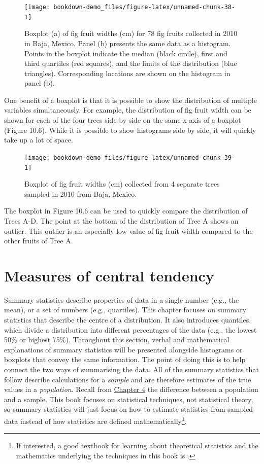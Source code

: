 \documentclass[
]{scrbook}
\begin{document}
\begin{figure}
\texttt{[image: bookdown-demo\_files/figure-latex/unnamed-chunk-38-1]} \caption{Boxplot (a) of fig fruit widths (cm) for 78 fig fruits collected in 2010 in Baja, Mexico. Panel (b) presents the same data as a histogram. Points in the boxplot indicate the median (black circle), first and third quartiles (red squares), and the limits of the distribution (blue triangles). Corresponding locations are shown on the histogram in panel (b).}\label{fig:unnamed-chunk-38}
\end{figure}

One benefit of a boxplot is that it is possible to show the distribution of multiple variables simultaneously.
For example, the distribution of fig fruit width can be shown for each of the four trees side by side on the same x-axis of a boxplot (Figure 10.6).
While it is possible to show histograms side by side, it will quickly take up a lot of space.

\begin{figure}
\texttt{[image: bookdown-demo\_files/figure-latex/unnamed-chunk-39-1]} \caption{Boxplot of fig fruit widths (cm) collected from 4 separate trees sampled in 2010 from Baja, Mexico.}\label{fig:unnamed-chunk-39}
\end{figure}

The boxplot in Figure 10.6 can be used to quickly compare the distribution of Trees A-D.
The point at the bottom of the distribution of Tree A shows an outlier.
This outlier is an especially low value of fig fruit width compared to the other fruits of Tree A.

\hypertarget{Chapter_11}{%
\chapter{Measures of central tendency}\label{Chapter_11}}

Summary statistics describe properties of data in a single number (e.g., the mean), or a set of numbers (e.g., quartiles).
This chapter focuses on summary statistics that describe the centre of a distribution.
It also introduces quantiles, which divide a distribution into different percentages of the data (e.g., the lowest 50\% or highest 75\%).
Throughout this section, verbal and mathematical explanations of summary statistics will be presented alongside histograms or boxplots that convey the same information.
The point of doing this is to help connect the two ways of summarising the data.
All of the summary statistics that follow describe calculations for a \emph{sample} and are therefore estimates of the true values in a \emph{population}.
Recall from \protect\hyperlink{Chapter_4}{Chapter 4} the difference between a population and a sample.
This book focuses on statistical techniques, not statistical theory, so summary statistics will just focus on how to estimate statistics from sampled data instead of how statistics are defined mathematically\footnote{If interested, a good textbook for learning about theoretical statistics and the mathematics underlying the techniques in this book is \citet{Miller2004}.}.
\end{document}
